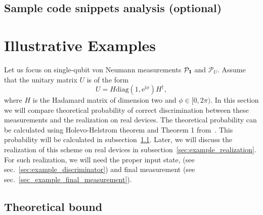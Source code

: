 \documentclass[preprint,12pt, a4paper]{elsarticle}
\newcommand{\1}{{\rm 1\hspace{-0.9mm}l}}
\newcommand{\ee}{\ensuremath{\mathrm{e}}}
\newcommand{\ii}{\ensuremath{\mathrm{i}}}
\newcommand{\PP}{\mathcal{P}}
\newcommand{\diag}{\mathrm{diag}}
\begin{document}
\subsection{Sample code snippets analysis (optional)}
\label{}



\section{Illustrative Examples}

Let us focus on single-qubit von Neumann measurements $\PP_\1$ and $\PP_U$.
Assume that the unitary matrix $U$ is of the form 
\begin{equation}
U = H \diag (1, \ee^{\ii \phi}) H^\dagger,
\end{equation}
where $H$ is the Hadamard matrix of dimension two and $\phi \in [0, 2 \pi)$.
In this section we will compare theoretical probability of correct 
discrimination between these measurements and the realization on real devices.
The theoretical probability can be calculated using Holevo-Helstrom theorem and 
Theorem 1 from~\cite{puchala2018strategies}. 
This probability will be calculated in 
subsection~\ref{sec:example_theoretical_probability}. Later, we will 
discuss the realization of this scheme on real devices in 
subsection~\ref{sec:example_realization}. For such realization, we 
will need the proper input state, (see sec.~\ref{sec:example_discriminator}) 
and final measurement (see sec.~\ref{sec_example_final_measurement}). 

\subsection{Theoretical bound}\label{sec:example_theoretical_probability}
\end{document}
